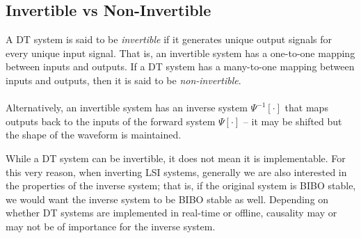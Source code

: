 \documentclass{report}
\begin{document}
\subsection{Invertible vs Non-Invertible}
A DT system is said to be \emph{invertible} if it generates unique output signals for every unique input signal. That is, an invertible system has a one-to-one mapping between 
inputs and outputs. If a DT system has a many-to-one mapping between inputs and outputs, then it is said to be \emph{non-invertible}. 
\\ \\
Alternatively, an invertible system has an inverse system $\Psi^{-1}[\cdot]$ that maps outputs back to the inputs of the forward system $\Psi[\cdot]$ -- it may be shifted but the shape of the waveform is maintained. 
\begin{center}
\end{center}
\begin{center}
\end{center}
While a DT system can be invertible, it does not mean it is implementable. For this very reason, when inverting LSI systems, generally we are also interested in the properties of the 
inverse system; that is, if the original system is BIBO stable, we would want the inverse system to be BIBO stable as well. Depending on whether DT systems are implemented in real-time 
or offline, causality may or may not be of importance for the inverse system. 
\end{document}
